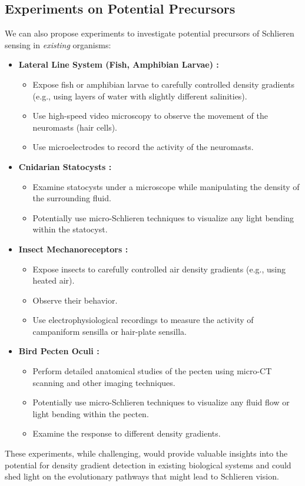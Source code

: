 \documentclass[11pt]{article}
\begin{document}
\subsection{Experiments on Potential Precursors}

We can also propose experiments to investigate potential precursors of Schlieren sensing in \textit{existing} organisms:
\begin{itemize}
    \item \textbf{Lateral Line System (Fish, Amphibian Larvae) \cite{Dijkgraaf1963LateralLine}:}
    \begin{itemize}
        \item Expose fish or amphibian larvae to carefully controlled density gradients (e.g., using layers of water with slightly different salinities).
        \item Use high-speed video microscopy to observe the movement of the neuromasts (hair cells).
        \item Use microelectrodes to record the activity of the neuromasts.
    \end{itemize}
    \item \textbf{Cnidarian Statocysts \cite{Budelmann1992InvertebrateHearing}:}
    \begin{itemize}
        \item Examine statocysts under a microscope while manipulating the density of the surrounding fluid.
        \item Potentially use micro-Schlieren techniques to visualize any light bending within the statocyst.
    \end{itemize}
    \item \textbf{Insect Mechanoreceptors \cite{Keil1997InsectMechanoreceptors}:}
    \begin{itemize}
        \item Expose insects to carefully controlled air density gradients (e.g., using heated air).
        \item Observe their behavior.
        \item Use electrophysiological recordings to measure the activity of campaniform sensilla or hair-plate sensilla.
    \end{itemize}
    \item \textbf{Bird Pecten Oculi \cite{Meyer1977AvianEye}:}
    \begin{itemize}
        \item Perform detailed anatomical studies of the pecten using micro-CT scanning and other imaging techniques.
        \item Potentially use micro-Schlieren techniques to visualize any fluid flow or light bending within the pecten.
        \item Examine the response to different density gradients.
    \end{itemize}
\end{itemize}
These experiments, while challenging, would provide valuable insights into the potential for density gradient detection in existing biological systems \cite{Merzkirch1987FlowVisualization} and could shed light on the evolutionary pathways that might lead to Schlieren vision.
\end{document}
